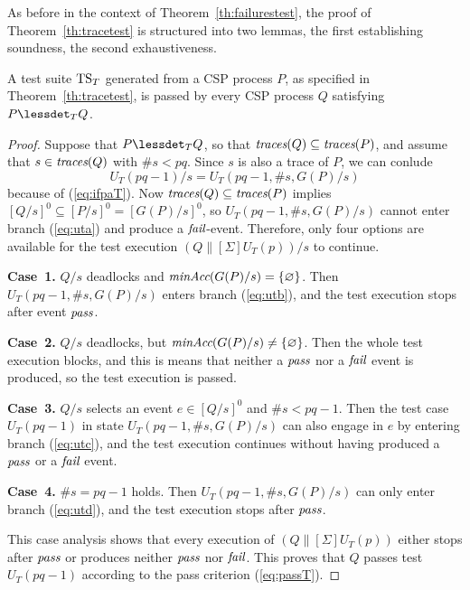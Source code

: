 As before in the context of Theorem~\ref{th:failurestest}, 
the proof of Theorem~\ref{th:tracetest} is structured into two lemmas, the first 
establishing soundness, the second exhaustiveness.
 
\begin{lemma}\label{lemma:mainfsoundtrace}
A test suite ${\text{TS}}_T$ generated from a CSP process $P$, as specified in
Theorem~\ref{th:tracetest}, is passed by every CSP process $Q$ satisfying
$P\lessdet_T Q$.
\end{lemma}
\begin{proof}
Suppose that $P\lessdet_T Q$, so that $\text{\it traces}(Q)\subseteq\text{\it traces}(P)$, and assume that
$s\in\text{\it traces}(Q)$ with $\#s < pq$. Since $s$ is also a trace of $P$, we can conlude
$$U_T(pq-1)/s = U_T(pq-1,\#s,G(P)/s)$$ because of (\ref{eq:ifpaT}). Now $\text{\it traces}(Q)\subseteq\text{\it traces}(P)$ 
implies $[Q/s]^0\subseteq [P/s]^0 = [G(P)/s]^0$, so $U_T(pq-1,\#s,G(P)/s)$ cannot enter branch (\ref{eq:uta}) and produce a ${\text{\it fail}}$-event. Therefore, only four options are
available for the test execution    $(Q\parallel[\Sigma] U_T(p))/s$ to continue.

\medskip
\noindent
{\bf Case~1.} $Q/s$ deadlocks and $\text{\it minAcc}(G(P)/s) = \{ \varnothing \}$. Then
$U_T(pq-1,\#s,G(P)/s)$ enters branch (\ref{eq:utb}), and the test execution 
stops after event ${\text{\it pass}}$.


\medskip
\noindent
{\bf Case~2.} $Q/s$ deadlocks, but $\text{\it minAcc}(G(P)/s)\neq\{\varnothing\}$. 
Then the whole test execution blocks, and this is means that
neither a ${\text{\it pass}}$ nor a ${\text{\it fail}}$ event is produced, so the test execution is passed.

\medskip
\noindent
{\bf Case~3.} $Q/s$ selects an event $e\in[Q/s]^0$ and $\#s < pq-1$. Then the test case 
$U_T(pq-1)$ in state
$U_T(pq-1,\#s,G(P)/s)$ can also engage in $e$ by entering branch (\ref{eq:utc}),
and the test execution continues without having produced a ${\text{\it pass}}$ or a ${\text{\it fail}}$ event.

\medskip
\noindent
{\bf Case~4.} $\#s = pq-1$ holds. Then $U_T(pq-1,\#s,G(P)/s)$ can only enter
branch (\ref{eq:utd}), and the test execution stops after ${\text{\it pass}}$.

This case analysis shows that every   execution of $(Q\parallel[\Sigma] U_T(p))$
either stops after ${\text{\it pass}}$ or produces neither ${\text{\it pass}}$ nor ${\text{\it fail}}$. This
proves that $Q$ passes test $U_T(pq-1)$ according to the pass  criterion (\ref{eq:passT}).
\xbox
\end{proof}

